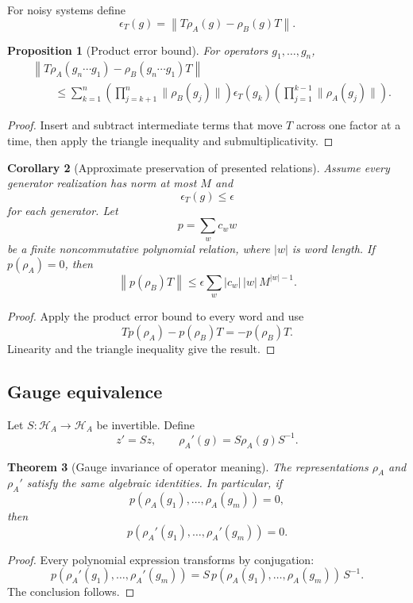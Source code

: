 \documentclass[11pt]{article}
\newtheorem{theorem}{Theorem}[section]
\newtheorem{proposition}[theorem]{Proposition}
\newtheorem{corollary}[theorem]{Corollary}
\theoremstyle{definition}
\theoremstyle{remark}
\newcommand{\Lat}{\mathcal H}
\begin{document}
For noisy systems define
\[
\epsilon_T(g)
=
\left\|
T\rho_A(g)-\rho_B(g)T
\right\|.
\]

\begin{proposition}[Product error bound]
For operators \(g_1,\ldots,g_n\),
\[
\begin{aligned}
&\left\|
T\rho_A(g_n\cdots g_1)
-
\rho_B(g_n\cdots g_1)T
\right\|\\
&\qquad\le
\sum_{k=1}^{n}
\left(
\prod_{j=k+1}^{n}\|\rho_B(g_j)\|
\right)
\epsilon_T(g_k)
\left(
\prod_{j=1}^{k-1}\|\rho_A(g_j)\|
\right).
\end{aligned}
\]
\end{proposition}

\begin{proof}
Insert and subtract intermediate terms that move \(T\) across one factor at a time, then apply the triangle inequality and submultiplicativity.
\end{proof}

\begin{corollary}[Approximate preservation of presented relations]
Assume every generator realization has norm at most \(M\) and
\[
\epsilon_T(g)\le\epsilon
\]
for each generator. Let
\[
p=\sum_w c_w w
\]
be a finite noncommutative polynomial relation, where \(|w|\) is word length. If \(p(\rho_A)=0\), then
\[
\left\|p(\rho_B)T\right\|
\le
\epsilon
\sum_w
|c_w|\,|w|\,M^{|w|-1}.
\]
\end{corollary}

\begin{proof}
Apply the product error bound to every word and use
\[
Tp(\rho_A)-p(\rho_B)T=-p(\rho_B)T.
\]
Linearity and the triangle inequality give the result.
\end{proof}

\subsection{Gauge equivalence}

Let \(S:\Lat_A\to\Lat_A\) be invertible. Define
\[
z'=Sz,
\qquad
\rho_A'(g)=S\rho_A(g)S^{-1}.
\]

\begin{theorem}[Gauge invariance of operator meaning]
The representations \(\rho_A\) and \(\rho_A'\) satisfy the same algebraic identities. In particular, if
\[
p(\rho_A(g_1),\ldots,\rho_A(g_m))=0,
\]
then
\[
p(\rho_A'(g_1),\ldots,\rho_A'(g_m))=0.
\]
\end{theorem}

\begin{proof}
Every polynomial expression transforms by conjugation:
\[
p(\rho_A'(g_1),\ldots,\rho_A'(g_m))
=
S\,p(\rho_A(g_1),\ldots,\rho_A(g_m))\,S^{-1}.
\]
The conclusion follows.
\end{proof}
\end{document}

